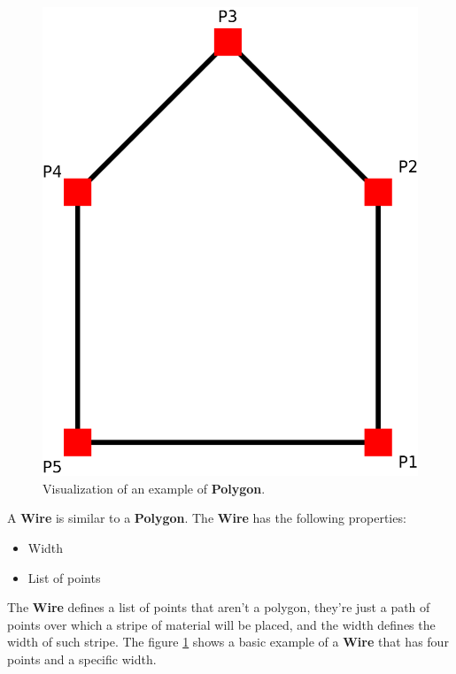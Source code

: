 \documentclass[11pt,twoside,openany,x11names,svgnames]{memoir}
\begin{document}
\begin{figure}
	\centering
	\includegraphics[scale=0.15, clip=true, trim= 0pt 0pt 0pt 0pt]{images/chapter03-image04}
	\caption{Visualization of an example of \textbf{Polygon}.}
	\label{fig:polygon}
\end{figure}

A \textbf{Wire} is similar to a \textbf{Polygon}. The \textbf{Wire} has the following properties:

\begin{itemize}
\item Width
\item List of points
\end{itemize}

The \textbf{Wire} defines a list of points that aren't a polygon, they're just a path of points over which a stripe of material will be placed, and the width defines the width of such stripe. The figure \ref{fig:polygon} shows a basic example of a \textbf{Wire} that has four points and a specific width.
\end{document}
